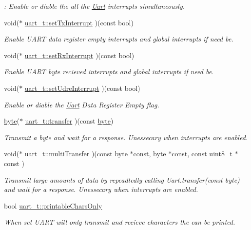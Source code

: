 \begin{DoxyCompactItemize}
\begin{DoxyCompactList}\small\item\em \-: Enable or diable the all the \hyperlink{a00009}{Uart} interrupts simultaneously. \end{DoxyCompactList}\item 
void($\ast$ \hyperlink{a00018_ga2c0c4fa765ead8abb7d84dcf6f39dbc2}{uart\-\_\-t\-::set\-Tx\-Interrupt} )(const bool)
\begin{DoxyCompactList}\small\item\em Enable U\-A\-R\-T data register empty interrupts and global interrupts if need be. \end{DoxyCompactList}\item 
void($\ast$ \hyperlink{a00018_gadc49d7eacb5b108a10e3a940bd2db9b7}{uart\-\_\-t\-::set\-Rx\-Interrupt} )(const bool)
\begin{DoxyCompactList}\small\item\em Enable U\-A\-R\-T byte recieved interrupts and global interrupts if need be. \end{DoxyCompactList}\item 
void($\ast$ \hyperlink{a00018_gacfecb860e1dfd5b7bd9523fccb7e9f1e}{uart\-\_\-t\-::set\-Udre\-Interrupt} )(const bool)
\begin{DoxyCompactList}\small\item\em Enable or diable the \hyperlink{a00009}{Uart} Data Register Empty flag. \end{DoxyCompactList}\item 
\hyperlink{a00011_a82b52bf2b45e214a8f2100ebfdf1aee4}{byte}($\ast$ \hyperlink{a00018_ga2c78990dd8babc3210665befa7ed7e4c}{uart\-\_\-t\-::transfer} )(const \hyperlink{a00011_a82b52bf2b45e214a8f2100ebfdf1aee4}{byte})
\begin{DoxyCompactList}\small\item\em Transmit a byte and wait for a response. Unessecary when interrupts are enabled. \end{DoxyCompactList}\item 
void($\ast$ \hyperlink{a00018_ga10aaaa60575c35598ae7033beafb5828}{uart\-\_\-t\-::multi\-Transfer} )(const \hyperlink{a00011_a82b52bf2b45e214a8f2100ebfdf1aee4}{byte} $\ast$const, \hyperlink{a00011_a82b52bf2b45e214a8f2100ebfdf1aee4}{byte} $\ast$const, const uint8\-\_\-t $\ast$const )
\begin{DoxyCompactList}\small\item\em Transmit large amounts of data by repeadtedly calling Uart.\-transfer(const byte) and wait for a response. Unessecary when interrupts are enabled. \end{DoxyCompactList}\item 
bool \hyperlink{a00018_ga715d9d9174c62b5682150875555dac96}{uart\-\_\-t\-::printable\-Chars\-Only}
\begin{DoxyCompactList}\small\item\em When set U\-A\-R\-T will only transmit and recieve characters the can be printed. \end{DoxyCompactList}\end{DoxyCompactItemize}


